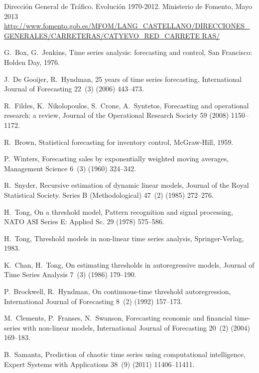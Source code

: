 \documentclass[runningheads]{llncs}
\begin{document}
\begin{thebibliography}{x}

Dirección General de Tráfico. Evolución 1970-2012. Ministerio de Fomento, Mayo 2013
\url{
http://www.fomento.gob.es/MFOM/LANG_CASTELLANO/DIRECCIONES_GENERALES/CARRETERAS/CATYEVO_RED_CARRETE
RAS/}

G.~Box, G.~Jenkins, Time series analysis: forecasting and control, San
  Francisco: Holden Day, 1976.

J.~{De Gooijer}, R.~Hyndman, 25 years of time series forecasting, International
  Journal of Forecasting 22~(3) (2006) 443--473.

R.~Fildes, K.~Nikolopoulos, S.~Crone, A.~Syntetos, Forecasting and operational
  research: a review, Journal of the Operational Research Society 59 (2008)
  1150--1172.

R.~Brown, Statistical forecasting for inventory control, McGraw-Hill, 1959.

P.~Winters, Forecasting sales by exponentially weighted moving averages,
  Management Science 6~(3) (1960) 324--342.

R.~Snyder, Recursive estimation of dynamic linear models, Journal of the Royal
  Statistical Society. Series B (Methodological) 47~(2) (1985) 272--276.

H.~Tong, On a threshold model, Pattern recognition and signal processing, NATO
  ASI Series E: Applied Sc. 29 (1978) 575--586.

H.~Tong, Threshold models in non-linear time series analysis, Springer-Verlag,
  1983.

K.~Chan, H.~Tong, On estimating thresholds in autoregressive models, Journal of
  Time Series Analysis 7~(3) (1986) 179--190.

P.~Brockwell, R.~Hyndman, On continuous-time threshold autoregression,
  International Journal of Forecasting 8~(2) (1992) 157--173.

M.~Clements, P.~Franses, N.~Swanson, Forecasting economic and financial
  time-series with non-linear models, International Journal of Forecasting
  20~(2) (2004) 169--183.

B.~Samanta, Prediction of chaotic time series using computational intelligence,
  Expert Systems with Applications 38~(9) (2011) 11406--11411.


\end{thebibliography}
\end{document}
